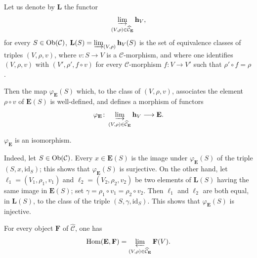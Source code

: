 \setcounter{footnote}{13}
Let us denote by \(\mathbf{L}\) the functor
\[
\varinjlim_{(V,\rho)\in\widehat{\mathcal{C}}_{\mathbf{E}}}\mathbf{h}_V,
\]
\ie for every \(S\in\operatorname{Ob}(\mathcal{C})\), \(\mathbf{L}(S)=\varinjlim_{(V,\rho)}\mathbf{h}_V(S)\) is the set of equivalence classes of triples \((V,\rho,v)\), where \(v\colon S\to V\) is a \(\mathcal{C}\)-morphism, and where one identifies \((V,\rho,v)\) with \((V',\rho',f\circ v)\) for every \(\mathcal{C}\)-morphism \(f\colon V\to V'\) such that \(\rho'\circ f=\rho\).

Then the map \(\varphi_{\mathbf{E}}(S)\) which, to the class of \((V,\rho,v)\), associates the element \(\rho\circ v\) of \(\mathbf{E}(S)\) is well-defined, and defines a morphism of functors
\[
\varphi_{\mathbf{E}}\colon
\varinjlim_{(V,\rho)\in\widehat{\mathcal{C}}_{\mathbf{E}}}\mathbf{h}_V
\longrightarrow\mathbf{E}.
\]

\begin{lemma}{\unskip}
\(\varphi_{\mathbf{E}}\) is an isomorphism.
\end{lemma}

Indeed, let \(S\in\operatorname{Ob}(\mathcal{C})\). Every \(x\in\mathbf{E}(S)\) is the image under \(\varphi_{\mathbf{E}}(S)\) of the triple \((S,x,\mathrm{id}_S)\); this shows that \(\varphi_{\mathbf{E}}(S)\) is surjective. On the other hand, let \(\ell_1=(V_1,\rho_1,v_1)\) and \(\ell_2=(V_2,\rho_2,v_2)\) be two elements of \(\mathbf{L}(S)\) having the same image in \(\mathbf{E}(S)\); set \(\gamma=\rho_1\circ v_1=\rho_2\circ v_2\). Then \(\ell_1\) and \(\ell_2\) are both equal, in \(\mathbf{L}(S)\), to the class of the triple \((S,\gamma,\mathrm{id}_S)\). This shows that \(\varphi_{\mathbf{E}}(S)\) is injective.

\begin{corollary}{\unskip}
For every object \(\mathbf{F}\) of \(\widehat{\mathcal{C}}\), one has
\[
\operatorname{Hom}(\mathbf{E},\mathbf{F})
=\varprojlim_{(V,\rho)\in\widehat{\mathcal{C}}_{\mathbf{E}}}\mathbf{F}(V).
\]
\end{corollary}

